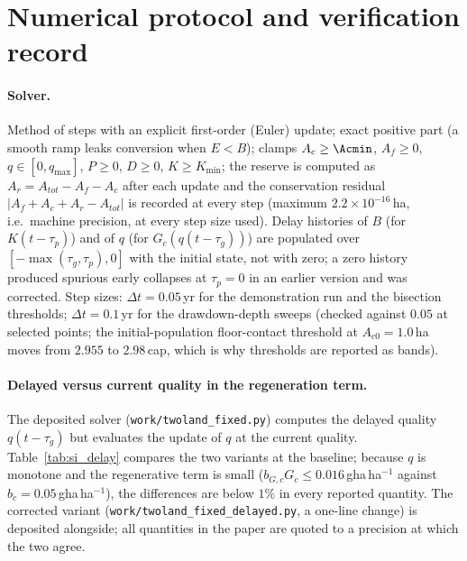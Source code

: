\section{Numerical protocol and verification record}\label{si:numerics}

\paragraph{Solver.} Method of steps with an explicit first-order (Euler) update; exact positive part (a smooth ramp leaks conversion when $E<B$); clamps $A_c\ge\Acmin$, $A_f\ge0$, $q\in[0,q_{\max}]$, $P\ge0$, $D\ge0$, $K\ge K_{\min}$; the reserve is computed as $A_r=A_{tot}-A_f-A_c$ after each update and the conservation residual $|A_f+A_c+A_r-A_{tot}|$ is recorded at every step (maximum $2.2\times10^{-16}$\,ha, i.e.\ machine precision, at every step size used). Delay histories of $B$ (for $K(t-\tau_p)$) and of $q$ (for $G_c(q(t-\tau_g))$) are populated over $[-\max(\tau_g,\tau_p),0]$ with the initial state, not with zero; a zero history produced spurious early collapses at $\tau_p=0$ in an earlier version and was corrected. Step sizes: $\Delta t=0.05$\,yr for the demonstration run and the bisection thresholds; $\Delta t=0.1$\,yr for the drawdown-depth sweeps (checked against $0.05$ at selected points; the initial-population floor-contact threshold at $A_{c0}=1.0$\,ha moves from $2.955$ to $2.98$\,cap, which is why thresholds are reported as bands).

\paragraph{Delayed versus current quality in the regeneration term.} The deposited solver (\texttt{work/twoland\_fixed.py}) computes the delayed quality $q(t-\tau_g)$ but evaluates the update of $q$ at the current quality. Table~\ref{tab:si_delay} compares the two variants at the baseline; because $q$ is monotone and the regenerative term is small ($b_{G,c}G_c\le0.016$\,gha\,ha$^{-1}$ against $b_c=0.05$\,gha\,ha$^{-1}$), the differences are below $1\%$ in every reported quantity. The corrected variant (\texttt{work/twoland\_fixed\_delayed.py}, a one-line change) is deposited alongside; all quantities in the paper are quoted to a precision at which the two agree.

